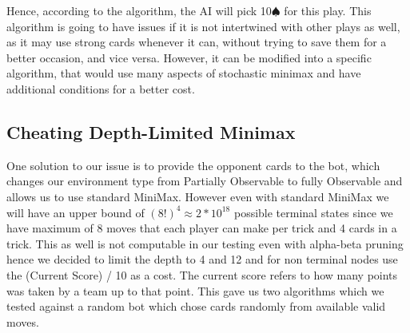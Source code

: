 Hence, according to the algorithm, the AI will pick 10$\spadesuit$ for this play. This algorithm is going to
have issues if it is not intertwined with other plays as well, as it may use strong cards whenever it can, without trying to
save them for a better occasion, and vice versa. However, it can be modified into a specific algorithm, that would
use many aspects of stochastic minimax and have additional conditions for a better cost.
\pagebreak
\subsection{Cheating Depth-Limited Minimax}
One solution to our issue is to provide the opponent cards to the bot, which changes our environment type from Partially Observable to fully Observable and allows us to use standard MiniMax.
However even with standard MiniMax we will have an upper bound of $(8!)^4 \approx 2*10^{18}$ possible terminal states since we have maximum of 8 moves that each player can make per trick and 4 cards in a trick.
This as well is not computable in our testing even with alpha-beta pruning hence we decided to limit the depth to 4 and 12 and for non terminal nodes use the (Current Score) / 10 as a cost.
The current score refers to how many points was taken by a team up to that point. This gave us two algorithms which we tested against a random bot which chose cards randomly from available valid moves.
